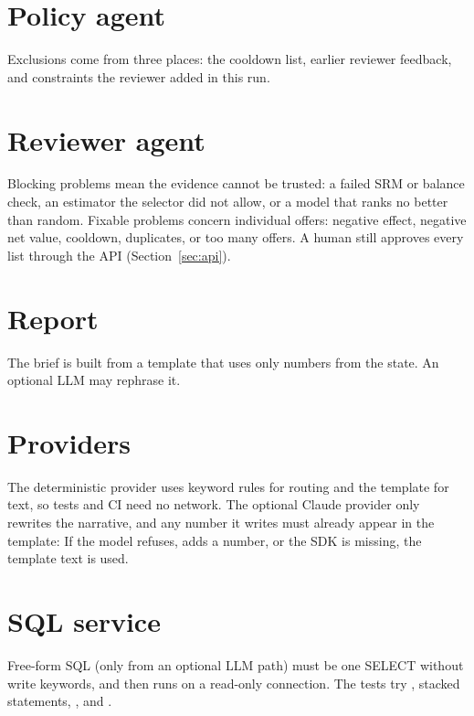 \documentclass[11pt]{article}
\begin{document}
\section{Policy agent}
\label{sec:policy-agent}
Exclusions come from three places: the cooldown list, earlier reviewer feedback, and constraints the reviewer added in this run.

\section{Reviewer agent}
\label{sec:reviewer}
Blocking problems mean the evidence cannot be trusted: a failed SRM or balance check, an estimator the selector did not allow, or a model that ranks no better than random. Fixable problems concern individual offers: negative effect, negative net value, cooldown, duplicates, or too many offers. A human still approves every list through the API (Section~\ref{sec:api}).

\section{Report}
\label{sec:report}
The brief is built from a template that uses only numbers from the state. An optional LLM may rephrase it.

\section{Providers}
\label{sec:providers}
The deterministic provider uses keyword rules for routing and the template for text, so tests and CI need no network. The optional Claude provider only rewrites the narrative, and any number it writes must already appear in the template:
If the model refuses, adds a number, or the SDK is missing, the template text is used.

\section{SQL service}
\label{sec:sql}
Free-form SQL (only from an optional LLM path) must be one SELECT without write keywords, and then runs on a read-only connection. The tests try , stacked statements, , and .
\end{document}
